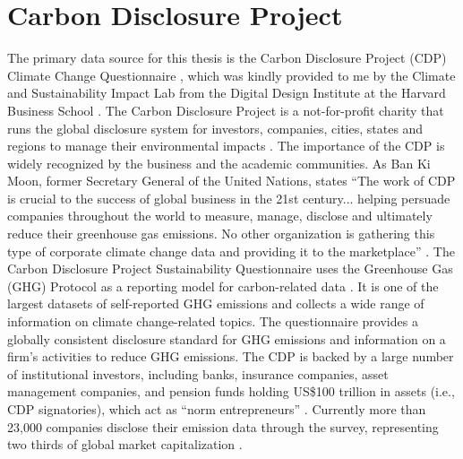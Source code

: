 \section{Carbon Disclosure Project}

The primary data source for this thesis is the Carbon Disclosure Project (CDP) Climate Change Questionnaire \cite{CDP2024}, which was kindly provided to me by the Climate and Sustainability Impact Lab from the Digital Design Institute at the Harvard Business School \cite{HarvardD3Lab2024}. The Carbon Disclosure Project is a not-for-profit charity that runs the global disclosure system for investors, companies, cities, states and regions to manage their environmental impacts \cite{CDPMain2024}. The importance of the CDP is widely recognized by the business and the academic communities. As Ban Ki Moon, former Secretary General of the United Nations, states ``The work of CDP is crucial to the success of global business in the 21st century... helping persuade companies throughout the world to measure, manage, disclose and ultimately reduce their greenhouse gas emissions. No other organization is gathering this type of corporate climate change data and providing it to the marketplace'' \cite{CDPMain2024}. The Carbon Disclosure Project Sustainability Questionnaire uses the Greenhouse Gas (GHG) Protocol as a reporting model for carbon-related data \cite{Andrew2011Accounting}. It is one of the largest datasets of self-reported GHG emissions and collects a wide range of information on climate change-related topics. The questionnaire provides a globally consistent disclosure standard for GHG emissions and information on a firm’s activities to reduce GHG emissions. The CDP is backed by a large number of institutional investors, including banks, insurance companies, asset management companies, and pension funds holding US\$100 trillion in assets (i.e., CDP signatories), which act as ``norm entrepreneurs'' \cite{OTT201714}. Currently more than 23,000 companies disclose their emission data through the survey, representing two thirds of global market capitalization \cite{CDPMain2024}. 

